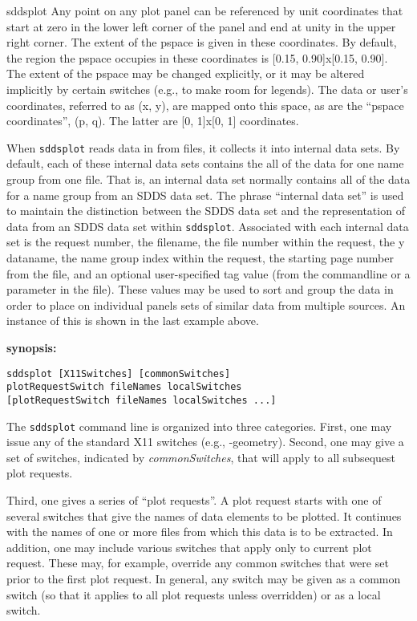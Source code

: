 \begin{sddsprog}{sddsplot}
Any point on any plot panel can be referenced by unit coordinates that start at zero in the lower
left corner of the panel and end at unity in the upper right corner.  The extent of the pspace is
given in these coordinates.  By default, the region the pspace occupies in these coordinates is
[0.15, 0.90]x[0.15, 0.90].  The extent of the pspace may be changed explicitly, or it
may be altered implicitly by certain switches (e.g., to make room for legends).  The data or user's
coordinates, referred to as (x, y), are mapped onto this space, as are the ``pspace coordinates'',
(p, q).  The latter are [0, 1]x[0, 1] coordinates.

When \verb|sddsplot| reads data in from files, it collects it into internal data sets. By default,
each of these internal data sets contains the all of the data for one name group from one file.  That
is, an internal data set normally contains all of the data for a name group from an SDDS data set.
The phrase ``internal data set'' is used to maintain the distinction between the SDDS data set and
the representation of data from an SDDS data set within \verb|sddsplot|.  Associated with each
internal data set is the request number, the filename, the file number within the request, the y
dataname, the name group index within the request, the starting page number from the file, and an
optional user-specified tag value (from the commandline or a parameter in the file).  These values
may be used to sort and group the data in order to place on individual panels sets of similar data
from multiple sources.  An instance of this is shown in the last example above.

  \item \textbf{synopsis:}
  \begin{verbatim}
sddsplot [X11Switches] [commonSwitches]
plotRequestSwitch fileNames localSwitches
[plotRequestSwitch fileNames localSwitches ...]
  \end{verbatim}

The \verb|sddsplot| command line is organized into three categories.  First, one may issue any of the standard X11
switches (e.g., -geometry).  Second, one may give a set of switches, indicated by {\em commonSwitches}, that will
apply to all subsequest plot requests.

Third, one gives a series of ``plot requests''.  A plot request starts with one of several switches that give the
names of data elements to be plotted.  It continues with the names of one or more files from which this data is to
be extracted.  In addition, one may include various switches that apply only to current plot request.  These may,
for example, override any common switches that were set prior to the first plot request.  In general, any switch
may be given as a common switch (so that it applies to all plot requests unless overridden) or as a local switch.


\end{sddsprog}
